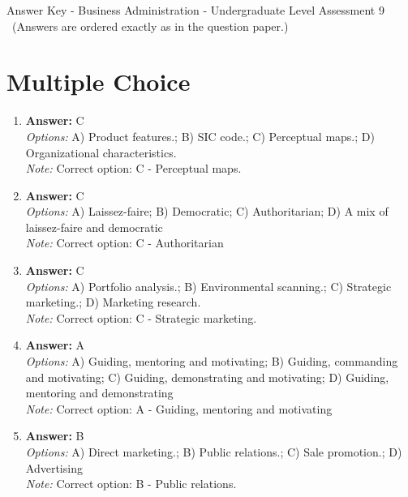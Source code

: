 \documentclass[12pt]{article}
\begin{document}
\begin{center}
Answer Key - Business Administration - Undergraduate Level Assessment 9 \
\small (Answers are ordered exactly as in the question paper.)
\end{center}

\section*{Multiple Choice}
\begin{enumerate}[label=\arabic*.]
\item \textbf{Answer:} C
\\ \textit{Options:} A) Product features.; B) SIC code.; C) Perceptual maps.; D) Organizational characteristics.
\\ \textit{Note:} Correct option: C - Perceptual maps.
\item \textbf{Answer:} C
\\ \textit{Options:} A) Laissez-faire; B) Democratic; C) Authoritarian; D) A mix of laissez-faire and democratic
\\ \textit{Note:} Correct option: C - Authoritarian
\item \textbf{Answer:} C
\\ \textit{Options:} A) Portfolio analysis.; B) Environmental scanning.; C) Strategic marketing.; D) Marketing research.
\\ \textit{Note:} Correct option: C - Strategic marketing.
\item \textbf{Answer:} A
\\ \textit{Options:} A) Guiding, mentoring and motivating; B) Guiding, commanding and motivating; C) Guiding, demonstrating and motivating; D) Guiding, mentoring and demonstrating
\\ \textit{Note:} Correct option: A - Guiding, mentoring and motivating
\item \textbf{Answer:} B
\\ \textit{Options:} A) Direct marketing.; B) Public relations.; C) Sale promotion.; D) Advertising
\\ \textit{Note:} Correct option: B - Public relations.
\end{enumerate}
\end{document}
